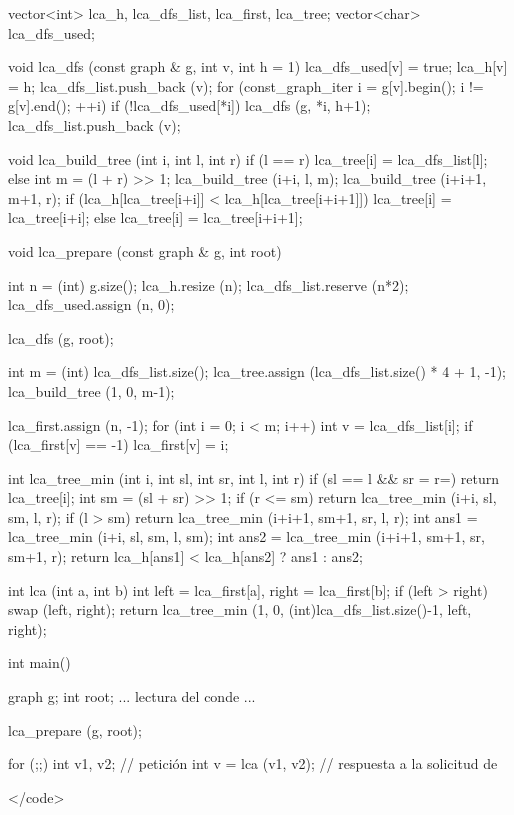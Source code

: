 vector<int> lca_h, lca_dfs_list, lca_first, lca_tree;
vector<char> lca_dfs_used;

void lca_dfs (const graph & g, int v, int h = 1)
{
lca_dfs_used[v] = true;
lca_h[v] = h;
lca_dfs_list.push_back (v);
for (const_graph_iter i = g[v].begin(); i != g[v].end(); ++i)
if (!lca_dfs_used[*i])
{
lca_dfs (g, *i, h+1);
lca_dfs_list.push_back (v);
}
}

void lca_build_tree (int i, int l, int r)
{
if (l == r)
lca_tree[i] = lca_dfs_list[l];
else
{
int m = (l + r) >> 1;
lca_build_tree (i+i, l, m);
lca_build_tree (i+i+1, m+1, r);
if (lca_h[lca_tree[i+i]] < lca_h[lca_tree[i+i+1]])
lca_tree[i] = lca_tree[i+i];
else
lca_tree[i] = lca_tree[i+i+1];
}
}

void lca_prepare (const graph & g, int root)
{
int n = (int) g.size();
lca_h.resize (n);
lca_dfs_list.reserve (n*2);
lca_dfs_used.assign (n, 0);

lca_dfs (g, root);

int m = (int) lca_dfs_list.size();
lca_tree.assign (lca_dfs_list.size() * 4 + 1, -1);
lca_build_tree (1, 0, m-1);

lca_first.assign (n, -1);
for (int i = 0; i < m; i++)
{
int v = lca_dfs_list[i];
if (lca_first[v] == -1)
lca_first[v] = i;
}
}

int lca_tree_min (int i, int sl, int sr, int l, int r)
{
if (sl == l && sr = r=)
return lca_tree[i];
int sm = (sl + sr) >> 1;
if (r <= sm)
return lca_tree_min (i+i, sl, sm, l, r);
if (l > sm)
return lca_tree_min (i+i+1, sm+1, sr, l, r);
int ans1 = lca_tree_min (i+i, sl, sm, l, sm);
int ans2 = lca_tree_min (i+i+1, sm+1, sr, sm+1, r);
return lca_h[ans1] < lca_h[ans2] ? ans1 : ans2;
}

int lca (int a, int b)
{
int left = lca_first[a],
right = lca_first[b];
if (left > right) swap (left, right);
return lca_tree_min (1, 0, (int)lca_dfs_list.size()-1, left, right);
}

int main()
{
graph g;
int root;
... lectura del conde ...

lca_prepare (g, root);

for (;;)
{
int v1, v2; // petición
int v = lca (v1, v2); // respuesta a la solicitud de
}
}</code>